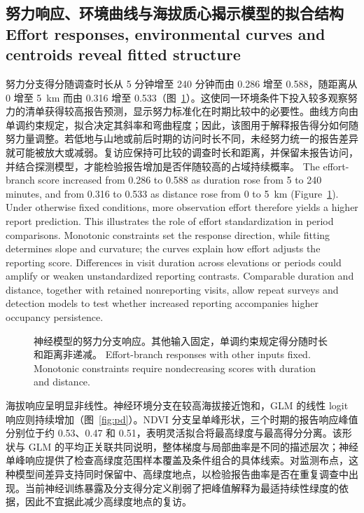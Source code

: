 \subsection{\ifzh 努力响应、环境曲线与海拔质心揭示模型的拟合结构\else Effort responses, environmental curves and centroids reveal fitted structure\fi}
\label{sec:responses}
\ifzh
努力分支得分随调查时长从 5 分钟增至 240 分钟而由 0.286 增至 0.588，随距离从 0 增至 5~km 而由 0.316 增至 0.533（图~\ref{fig:eff}）。这使同一环境条件下投入较多观察努力的清单获得较高报告预测，显示努力标准化在时期比较中的必要性。曲线方向由单调约束规定，拟合决定其斜率和弯曲程度；因此，该图用于解释报告得分如何随努力量调整。若低地与山地或前后时期的访问时长不同，未经努力统一的报告差异就可能被放大或减弱。复访应保持可比较的调查时长和距离，并保留未报告访问，并结合探测模型，才能检验报告增加是否伴随较高的占域持续概率。
\else
The effort-branch score increased from 0.286 to 0.588 as duration rose from 5 to 240 minutes, and from 0.316 to 0.533 as distance rose from 0 to 5~km (Figure~\ref{fig:eff}). Under otherwise fixed conditions, more observation effort therefore yields a higher report prediction. This illustrates the role of effort standardization in period comparisons. Monotonic constraints set the response direction, while fitting determines slope and curvature; the curves explain how effort adjusts the reporting score. Differences in visit duration across elevations or periods could amplify or weaken unstandardized reporting contrasts. Comparable duration and distance, together with retained nonreporting visits, allow repeat surveys and detection models to test whether increased reporting accompanies higher occupancy persistence.
\fi
\begin{figure}[htbp]\centering{}
\caption{\ifzh
神经模型的努力分支响应。其他输入固定，单调约束规定得分随时长和距离非递减。
\else
Effort-branch responses with other inputs fixed. Monotonic constraints require nondecreasing scores with duration and distance.
\fi}\label{fig:eff}
\end{figure}
\ifzh
海拔响应呈明显非线性。神经环境分支在较高海拔接近饱和，GLM 的线性 logit 响应则持续增加（图~\ref{fig:pd}）。NDVI 分支呈单峰形状，三个时期的报告响应峰值分别位于约 0.53、0.47 和 0.51，表明灵活拟合将最高绿度与最高得分分离。该形状与 GLM 的平均正关联共同说明，整体梯度与局部曲率是不同的描述层次；神经单峰响应提供了检查高绿度范围样本覆盖及条件组合的具体线索。对监测布点，这种模型间差异支持同时保留中、高绿度地点，以检验报告曲率是否在重复调查中出现。当前神经训练暴露及分支得分定义削弱了把峰值解释为最适持续性绿度的依据，因此不宜据此减少高绿度地点的复访。
